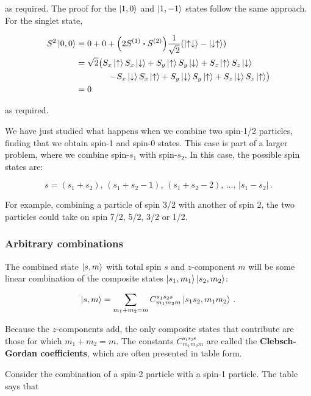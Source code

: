 \documentclass[12pt, titlepage]{article}
\begin{document}
as required. The proof for the $\ket{1, 0}$ and $\ket{1, -1}$ states follow the same approach. For the singlet state,

\begin{align*}
	S^2\ket{0,0} &= 0 + 0 + \qty(2S^{(1)}\vdot S^{(2)})\frac{1}{\sqrt{2}}(\ket{\uparrow\downarrow}-\ket{\downarrow\uparrow}) \\
	&= \sqrt{2}\bigl(S_x\ket{\uparrow}S_x\ket{\downarrow} + S_y\ket{\uparrow}S_y\ket{\downarrow} + S_z\ket{\uparrow}S_z\ket{\downarrow} \bigr. \\
	& \qquad\qquad \bigl.- S_x\ket{\downarrow}S_x\ket{\uparrow} + S_y\ket{\downarrow}S_y\ket{\uparrow} + S_z\ket{\downarrow}S_z\ket{\uparrow}\bigr) \\
	&= 0
\end{align*}

as required. 

We have just studied what happens when we combine two spin-1/2 particles, finding that we obtain spin-1 and spin-0 states. This case is part of a larger problem, where we combine spin-$s_1$ with spin-$s_2$. In this case, the possible spin states are:

\begin{equation}
	s = (s_1+s_2),\, (s_1+s_2-1),\, (s_1+s_2-2),\, \ldots,\, |s_1-s_2| \,.
\end{equation}

For example, combining a particle of spin 3/2 with another of spin 2, the two particles could take on spin 7/2, 5/2, 3/2 or 1/2.

\subsubsection{Arbitrary combinations}
The combined state $\ket{s, m}$ with total spin $s$ and $z$-component $m$ will be some linear combination of the composite states $\ket{s_1, m_1}\ket{s_2, m_2}$:

\begin{equation}
	\ket{s,m} = \sum_{m_1+m_2=m}C_{m_1m_2m}^{s_1s_2s}\ket{s_1s_2,m_1m_2} \,.
\end{equation}

Because the $z$-components add, the only composite states that contribute are those for which $m_1+m_2=m$. The constants $C_{m_1m_2m}^{s_1s_2s}$ are called the \textbf{Clebsch-Gordan coefficients}, which are often presented in table form.


Consider the combination of a spin-2 particle with a spin-1 particle. The table says that
\end{document}
